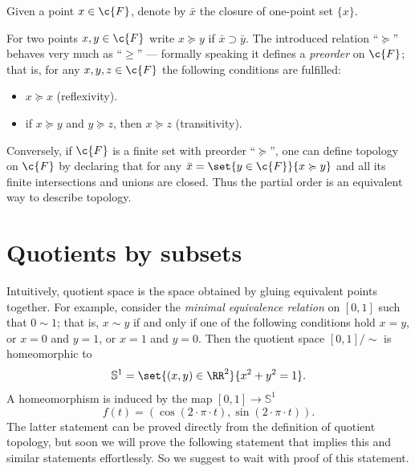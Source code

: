 Given a point $x\in \c{F}$,
denote by $\bar x$ the closure of one-point set $\{x\}$.

For two points $x,y\in \c{F}$ write $x\succcurlyeq y$ if $\bar x\supset \bar y$.
The introduced relation ``$\succcurlyeq$'' behaves very much as ``$\ge$'' --- formally speaking it defines a \emph{preorder} on $\c{F}$;
that is, for any $x,y,z\in\c{F}$ the following conditions are fulfilled:
\begin{itemize}
\item $x\succcurlyeq x$ (reflexivity).
\item if $x\succcurlyeq y$ and $y\succcurlyeq z$, then $x\succcurlyeq z$ (transitivity).
\end{itemize}

Conversely, if $\c{F}$ is a finite set with preorder ``$\succcurlyeq$'',
one can define topology on $\c{F}$ by declaring that for any $\bar x=\set{y\in \c{F}}{x\succcurlyeq y}$ and all its finite intersections and unions are closed.
Thus the partial order is an equivalent way to describe topology.



























\section{Quotients by subsets}

Intuitively, quotient space is the space obtained by gluing equivalent points together.
For example, consider the \emph{minimal equivalence relation} on $[0,1]$ such that $0\sim 1$;
that is, $x\sim y$ if and only if one of the following conditions hold $x=y$, or $x=0$ and $y=1$, or $x=1$ and $y=0$.
Then the quotient space $[0,1]/{\sim}$ is homeomorphic to 
\[\mathbb{S}^1=\set{(x,y)\in\RR^2}{x^2+y^2=1}.\]
A homeomorphism is induced by the map $[0,1]\to \mathbb{S}^1$
\[f(t)=\left(\cos(2\cdot\pi\cdot t),\sin(2\cdot\pi\cdot t)\right).\]
The latter statement can be proved directly from the definition of quotient topology, but soon we will prove the following statement that implies this and similar statements effortlessly.
So we suggest to wait with proof of this statement.

